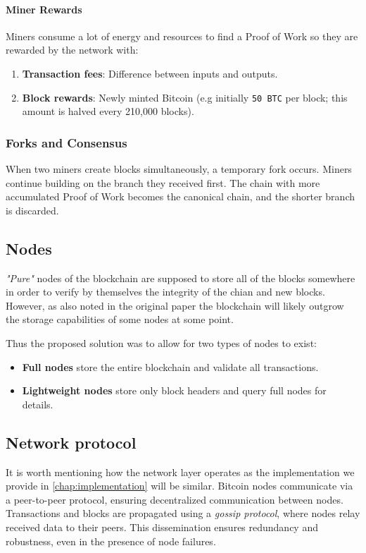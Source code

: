 \paragraph{Miner Rewards}
Miners consume a lot of energy and resources to find a Proof of Work so they are rewarded by the network with:
\begin{enumerate}
  \item \textbf{Transaction fees}: Difference between inputs and outputs.
  \item \textbf{Block rewards}: Newly minted Bitcoin (e.g initially \texttt{50 BTC} per block; this amount is
    halved every 210,000 blocks).
\end{enumerate}

\subsubsection{Forks and Consensus}
When two miners create blocks simultaneously, a temporary fork occurs. Miners continue building on the branch
they received first. The chain with more accumulated Proof of Work becomes the canonical chain, and the
shorter branch is discarded.

\subsection{Nodes} \label{sec:bitcoin-nodes}
\textit{"Pure"} nodes of the blockchain are supposed to store all of the blocks somewhere in order to verify
by themselves the integrity of the chian and new blocks.
However, as also noted in the original paper \cite{BitcoinWhitePaper} the blockchain will likely outgrow the
storage capabilities of some nodes at some point.

Thus the proposed solution was to allow for two types of nodes to exist:
\begin{itemize}
  \item \textbf{Full nodes} store the entire blockchain and validate all transactions.
  \item \textbf{Lightweight nodes} store only block headers and query full nodes for details.
\end{itemize}

\subsection{Network protocol}\label{sec:bitcoin-network}
It is worth mentioning how the network layer operates as the implementation we provide in
\ref{chap:implementation} will be similar.
Bitcoin nodes communicate via a peer-to-peer protocol, ensuring decentralized communication between nodes.
Transactions and blocks are propagated using a \textit{gossip protocol}, where nodes relay received data to
their peers. This dissemination ensures redundancy and robustness, even in the presence of node failures.

